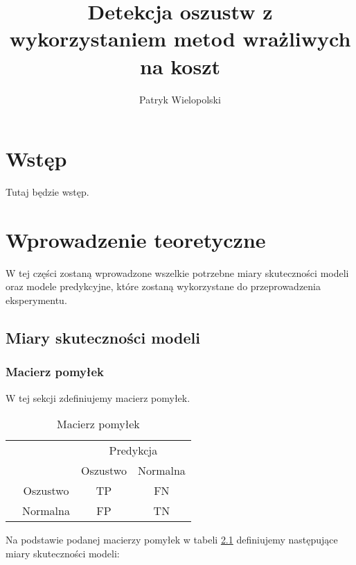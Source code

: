 \documentclass{book}
\title{Detekcja oszustw z wykorzystaniem metod wrażliwych na koszt}
\author{Patryk Wielopolski}
\begin{document}
	
	\newcommand{\htx}{h_{\theta}(\boldsymbol{x_i})}
	
	\newenvironment{talign}
	{\align}
	{\endalign}
	
	\newenvironment{talign*}
	{\csname align*\endcsname}
	{\endalign}

\maketitle

\chapter{Wstęp}
Tutaj będzie wstęp.

\chapter{Wprowadzenie teoretyczne}

W tej części zostaną wprowadzone wszelkie potrzebne miary skuteczności modeli oraz modele predykcyjne, które zostaną wykorzystane do przeprowadzenia eksperymentu. 

\section{Miary skuteczności modeli}

\subsection{Macierz pomyłek}

W tej sekcji zdefiniujemy macierz pomyłek.
\begin{table}[h]
	\begin{center}
		\makegapedcells
		\begin{tabular}{cc|cc}
			\multicolumn{2}{c}{}     &   \multicolumn{2}{c}{Predykcja} \\
			&            &   Oszustwo &   Normalna     \\ 
			\cline{2-4}
			\multirow{2}{*}{\rotatebox[origin=c]{90}{Prawda}} & Oszustwo   & TP         & FN              \\
			& Normalna   & FP         & TN              \\ 
			\cline{2-4}
		\end{tabular}
	\end{center}
	\caption{Macierz pomyłek}
	\label{macierz-pomylek}
\end{table}


Na podstawie podanej macierzy pomyłek w tabeli \ref{macierz-pomylek} definiujemy następujące miary skuteczności modeli:
\end{document}
